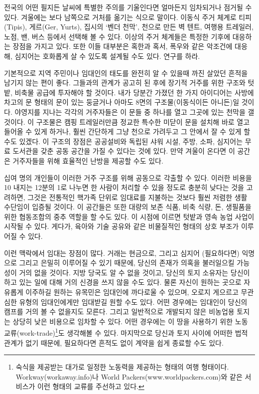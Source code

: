 \documentclass[10pt, b6paper, openany]{memoir}
\begin{document}
\begin{article}
전국의 어떤 필지든 날씨에 특별한 주의를 기울인다면 얼마든지 임차되거나 점거될 수 있다.  겨울에는 보다 남쪽으로 거처를 옮기는 식으로 말이다. 이동식 주거 체계로 티피(Tipis), 게르(Ger, Yurts), 집시의 `벤더 천막', 천으로 만든 벽 텐트, 여행용 트레일러, 노점, 밴, 버스 등에서 선택해 볼 수 있다. 이상의 주거 체계들은 특정한 기후에 대응하는 장점을 가지고 있다. 또한 이들 대부분은 혹한과 혹서, 폭우와 같은 악조건에 대응해, 심지어는 호화롭게 살 수 있도록 설계될 수도 있다. 연구를 하라. 

기본적으로 지역 주민이나 임대인의 태도를 완전히 알 수 있을때 까진 살았던 흔적을 남기지 않는 편이 좋다. 그들과의  관계가 공고히 된 후에 장기적 거주를 위한 구조와 텃밭, 비축물 공급에 투자해야 할 것이다. 내가 당분간 가졌던 한 가지 아이디어는 사방에 차고의 문 형태의 문이 있는 둥글거나 아마도 8면의 구조물(이동식이든 아니든)일 것이다. 야영지를 지나는 각각의 거주자들은 이 문들 중 하나를 열고 그곳에 있는 천막을 갤 것이다. 이 구조물은 캠핑 트레일러만큼 정교한 특수한 미닫이 문을 설치해 바로 열고 들어올 수 있게 하거나, 훨씬 간단하게 그냥 천으로 가려두고 그 안에서 잘 수 있게 할 수도 있겠다. 이 구조의 장점은 공공설비와 독립된 샤워 시설, 주방, 소파, 심지어는 무료 도서관을 갖춘 공동 공간을 가질 수 있다는 것에 있다. 만약 겨울이 온다면 이 공간은 거주자들을 위해 효율적인 난방을 제공할 수도 있다.

십여 명의 개인들이 이러한 거주 구조를 위해 공동으로 각출할 수 있다. 이러한 비용을 10 내지는 12분의 1로 나누면 한 사람이 처리할 수 있을 정도로 충분히 낮다는 것을 고려하면, 그것은 전통적인 핵가족 단위로 임대료를 지불하는 것보다 훨씬 저렴한 생활 수단임이 입증될 것이다. 이 공간들은 또한 대량의 보존 식품, 비축 식량, 돈, 생필품을 위한 협동조합의 중추 역할을 할 수도 있다. 이 시점에 이르면 텃밭과 영속 농업 사업이 시작될 수 있다. 게다가, 육아와 기술 공유와 같은 비물질적인 형태의 상호 부조가 이루어질 수 있다. 

이런 맥락에서 임대는 장점이 많다. 거래는 현금으로, 그리고 심지어 (필요하다면) 익명으로 그리고 은밀히 이루어질 수 있기 때문에, 당신의 존재가 의혹을 불러일으킬 가능성이 거의 없을 것이다. 지방 당국도 알 수 없을 것이고, 당신의 토지 소유자는 당신이 하고 있는 일에 대해 거의 신경을 쓰지 않을 수도 있다. 물론 자신이 원하는 곳으로 자유롭게 이주하길 원하는 유목민은 임대인에 까다로울 수 있으며, 오로지 게으르고 무관심한 유형의 임대인에게만 임대받길 원할 수도 있다. 어떤 경우에는 임대인이 당신의 캠프를 거의 볼 수 없을지도 모른다. 그리고 일반적으로 개발되지 않은 비농업용 토지는 상당히 낮은 비용으로 임차할 수 있다. 어떤 경우에는 이 땅을 사용하기 위한 노동 교류(work-trade)\footnote{숙식을 제공받는 대가로 일정한 노동력을 제공하는 형태의 여행 형태이다. Workway(workaway.info)나 World Packers(www.worldpackers.com)와 같은 서비스가 이런 형태의 교류를 주선하고 있다.}도 생각해볼 수 있다. 마지막으로 당신과 토지 사이에 어떠한 법적 관계가 없기 때문에, 필요하다면 흔적도 없이 계약을 쉽게 종료할 수도 있다. 


\end{article}
\end{document}
